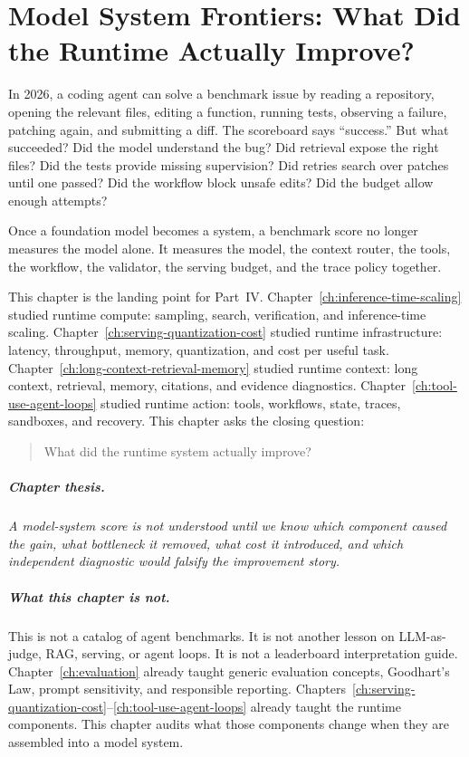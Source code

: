 \chapter[Model System Frontiers]{Model System Frontiers: What Did the Runtime Actually Improve?}
\label{ch:evaluating-model-systems}
\raggedbottom

In 2026, a coding agent can solve a benchmark issue by reading a repository, opening the relevant files, editing a function, running tests, observing a failure, patching again, and submitting a diff. The scoreboard says ``success.'' But what succeeded? Did the model understand the bug? Did retrieval expose the right files? Did the tests provide missing supervision? Did retries search over patches until one passed? Did the workflow block unsafe edits? Did the budget allow enough attempts?

Once a foundation model becomes a system, a benchmark score no longer measures the model alone. It measures the model, the context router, the tools, the workflow, the validator, the serving budget, and the trace policy together.

This chapter is the landing point for Part~IV. Chapter~\ref{ch:inference-time-scaling} studied runtime compute: sampling, search, verification, and inference-time scaling. Chapter~\ref{ch:serving-quantization-cost} studied runtime infrastructure: latency, throughput, memory, quantization, and cost per useful task. Chapter~\ref{ch:long-context-retrieval-memory} studied runtime context: long context, retrieval, memory, citations, and evidence diagnostics. Chapter~\ref{ch:tool-use-agent-loops} studied runtime action: tools, workflows, state, traces, sandboxes, and recovery. This chapter asks the closing question:

\begin{quote}
What did the runtime system actually improve?
\end{quote}

\paragraph{Chapter thesis.} \emph{A model-system score is not understood until we know which component caused the gain, what bottleneck it removed, what cost it introduced, and which independent diagnostic would falsify the improvement story.}

\paragraph{What this chapter is not.} This is not a catalog of agent benchmarks. It is not another lesson on LLM-as-judge, RAG, serving, or agent loops. It is not a leaderboard interpretation guide. Chapter~\ref{ch:evaluation} already taught generic evaluation concepts, Goodhart's Law, prompt sensitivity, and responsible reporting. Chapters~\ref{ch:serving-quantization-cost}--\ref{ch:tool-use-agent-loops} already taught the runtime components. This chapter audits what those components change when they are assembled into a model system.

